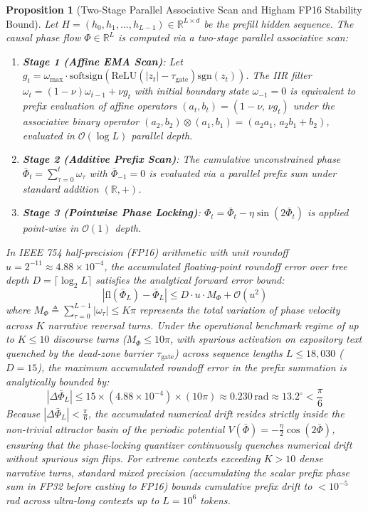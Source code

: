 \documentclass[11pt,a4paper]{article}
\newtheorem{proposition}[theorem]{Proposition}
\theoremstyle{definition}
\begin{document}
\begin{proposition}[Two-Stage Parallel Associative Scan and Higham FP16 Stability Bound]
\label{prop:associative_scan}
Let $H = (h_0, h_1, \dots, h_{L-1}) \in \mathbb{R}^{L \times d}$ be the prefill hidden sequence. The causal phase flow $\Phi \in \mathbb{R}^L$ is computed via a two-stage parallel associative scan:
\begin{enumerate}
    \item \textbf{Stage 1 (Affine EMA Scan)}: Let $g_t = \omega_{\max} \cdot \mathrm{softsign}(\mathrm{ReLU}(|z_t| - \tau_{\text{gate}})\mathrm{sgn}(z_t))$. The IIR filter $\omega_t = (1-\nu)\omega_{t-1} + \nu g_t$ with initial boundary state $\omega_{-1}=0$ is equivalent to prefix evaluation of affine operators $(a_t, b_t) = (1-\nu, \, \nu g_t)$ under the associative binary operator $(a_2, b_2) \otimes (a_1, b_1) = (a_2 a_1, \, a_2 b_1 + b_2)$, evaluated in $\mathcal{O}(\log L)$ parallel depth.
    \item \textbf{Stage 2 (Additive Prefix Scan)}: The cumulative unconstrained phase $\bar{\Phi}_t = \sum_{\tau=0}^t \omega_\tau$ with $\bar{\Phi}_{-1}=0$ is evaluated via a parallel prefix sum under standard addition $(\mathbb{R}, +)$.
    \item \textbf{Stage 3 (Pointwise Phase Locking)}: $\Phi_t = \bar{\Phi}_t - \eta\sin(2\bar{\Phi}_t)$ is applied point-wise in $\mathcal{O}(1)$ depth.
\end{enumerate}
In IEEE 754 half-precision (FP16) arithmetic with unit roundoff $u = 2^{-11} \approx 4.88 \times 10^{-4}$, the accumulated floating-point roundoff error over tree depth $D = \lceil \log_2 L \rceil$ satisfies the analytical forward error bound:
\begin{equation}
|\mathrm{fl}(\bar{\Phi}_L) - \bar{\Phi}_L| \le D \cdot u \cdot M_\Phi + \mathcal{O}(u^2)
\end{equation}
where $M_\Phi \triangleq \sum_{\tau=0}^{L-1} |\omega_\tau| \le K\pi$ represents the total variation of phase velocity across $K$ narrative reversal turns. Under the operational benchmark regime of up to $K \le 10$ discourse turns ($M_\Phi \le 10\pi$, with spurious activation on expository text quenched by the dead-zone barrier $\tau_{\text{gate}}$) across sequence lengths $L \le 18,030$ ($D = 15$), the maximum accumulated roundoff error in the prefix summation is analytically bounded by:
\begin{equation}
|\Delta \bar{\Phi}_L| \le 15 \times (4.88 \times 10^{-4}) \times (10\pi) \approx 0.230\,\text{rad} \approx 13.2^\circ < \frac{\pi}{6}
\end{equation}
Because $|\Delta \bar{\Phi}_L| < \frac{\pi}{6}$, the accumulated numerical drift resides strictly inside the non-trivial attractor basin of the periodic potential $V(\bar{\Phi}) = -\frac{\eta}{2}\cos(2\bar{\Phi})$, ensuring that the phase-locking quantizer continuously quenches numerical drift without spurious sign flips. For extreme contexts exceeding $K > 10$ dense narrative turns, standard mixed precision (accumulating the scalar prefix phase sum in FP32 before casting to FP16) bounds cumulative prefix drift to $< 10^{-5}$ rad across ultra-long contexts up to $L = 10^6$ tokens.
\end{proposition}
\end{document}
